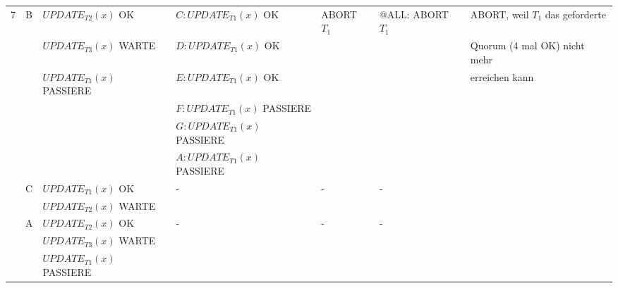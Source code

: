 \documentclass[a4paper, landscape]{article}
\begin{document}
\begin{tabular}{| l | l | l | l | l | l | p{6cm} |}
7 & \multirow{6}{*}{B} 
			&    $UPDATE_{T2}(x)$ OK	      &  $C: UPDATE_{T1}(x)$ OK 	& ABORT $T_1$ & @ALL: ABORT $T_1$ & ABORT, weil $T_1$ das geforderte\\
			&&  $UPDATE_{T3}(x)$ WARTE  & $D: UPDATE_{T1}(x)$ OK  &    &   & Quorum (4 mal OK) nicht mehr \\
			&&  $UPDATE_{T1}(x)$ PASSIERE & $E: UPDATE_{T1}(x)$ OK &    &  & erreichen kann \\
			& &																	   	& $F: UPDATE_{T1}(x)$ PASSIERE & & &\\
			& &																	   	& $G: UPDATE_{T1}(x)$ PASSIERE & & & \\
			& &																	   	& $A: UPDATE_{T1}(x)$ PASSIERE & & & \\
\cline{2-7}
& \multirow{2}{*}{C} 
			&   $UPDATE_{T1}(x)$ OK 		& - 	& - &	 -  &\\
			&& $UPDATE_{T2}(x)$ WARTE   &   &   &	   &  \\
\cline{2-7}
& \multirow{2}{*}{A} 
			&   $UPDATE_{T2}(x)$ OK 		& - 	& - &	 -  &\\
			&& $UPDATE_{T3}(x)$ WARTE   &   &   &	   &  \\
			&&  $UPDATE_{T1}(x)$ PASSIERE &  &  &   & \\
\hline
\end{tabular}
\newpage
\end{document}
